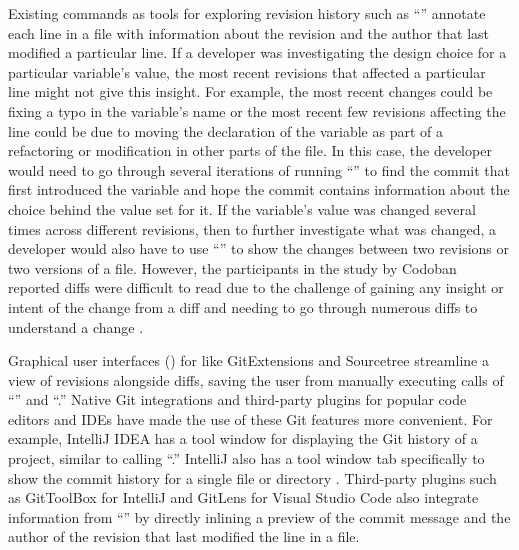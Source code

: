 Existing  commands as tools for exploring revision history such 
as ``'' \cite{gitblame} annotate each line in a file with information about the revision 
and the author that last modified a particular line.
If a developer was investigating the design choice for a particular variable's value, 
the most recent revisions that affected a particular line might not give this insight.
For example, the most recent changes could be fixing a typo in the variable's name or the most recent 
few revisions affecting the line could be due to moving the declaration of the variable as part 
of a refactoring or modification in other parts of the file.
In this case, the developer would need to go through several iterations of running ``'' 
to find the commit that first introduced the variable and hope the commit contains information 
about the choice behind the value set for it.
If the variable's value was changed several times across different revisions, 
then to further investigate what was changed, 
a developer would also have to use ``'' \cite{gitdiff} to show the 
changes between two revisions or two versions of a file.
However, the participants in the study by Codoban \etal reported diffs were difficult 
to read due to the challenge of gaining any insight or intent of the change from a diff 
and needing to go through numerous diffs to understand a change \cite{codoban_software_2015}.

Graphical user interfaces () for  like GitExtensions \cite{gitextensions} 
and Sourcetree \cite{sourcetree} streamline a view of revisions alongside diffs, 
saving the user from manually executing calls of ``'' and ``.'' 
Native Git integrations and third-party plugins for popular code editors and IDEs 
have made the use of these Git features more convenient. 
For example, IntelliJ IDEA \cite{intellij} has a tool window for displaying the Git  
history of a project, similar to calling ``.''
IntelliJ also has a tool window tab specifically to show the commit history 
for a single file or directory \cite{intellij-showhistory}.
Third-party plugins such as GitToolBox \cite{gittoolbox} for IntelliJ and GitLens \cite{gitlens} 
for Visual Studio Code also integrate information from ``'' by directly 
inlining a preview of the commit message and the author of the revision that last modified the line in a file.

